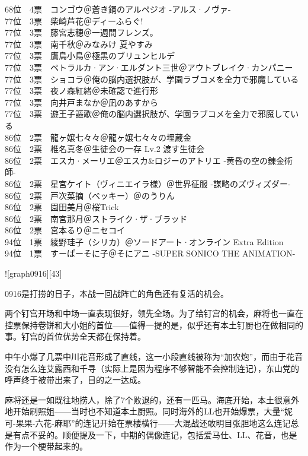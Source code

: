 {    68位　4票　コンゴウ＠蒼き鋼のアルペジオ -アルス·ノヴァ-\\
    77位　3票　柴崎芦花＠ディーふらぐ!\\
    77位　3票　藤宮志穂＠一週間フレンズ。\\
    77位　3票　南千秋＠みなみけ 夏やすみ\\
    77位　3票　鷹鳥小鳥＠極黒のブリュンヒルデ\\
    77位　3票　ペトラルカ·アン·エルダント三世＠アウトブレイク·カンパニー\\
    77位　3票　ショコラ＠俺の脳内選択肢が、学園ラブコメを全力で邪魔している\\
    77位　3票　夜ノ森紅緒＠未確認で進行形\\
    77位　3票　向井戸まなか＠凪のあすから\\
    77位　3票　遊王子謳歌＠俺の脳内選択肢が、学園ラブコメを全力で邪魔している\\
    86位　2票　龍ヶ嬢七々々＠龍ヶ嬢七々々の埋蔵金\\
    86位　2票　椎名真冬＠生徒会の一存 Lv.2 渡す生徒会\\
    86位　2票　エスカ·メーリエ＠エスカ\&ロジーのアトリエ -黄昏の空の錬金術師-\\
    86位　2票　星宮ケイト（ヴィニエイラ様）＠世界征服 -謀略のズヴィズダー-\\
    86位　2票　戸次菜摘（ベッキー）＠のうりん\\
    86位　2票　園田美月＠桜Trick\\
    86位　2票　南宮那月＠ストライク·ザ·ブラッド\\
    86位　2票　宮本るり＠ニセコイ\\
    94位　1票　綾野珪子（シリカ）＠ソードアート·オンライン Extra Edition\\
    94位　1票　すーぱーそに子＠そにアニ -SUPER SONICO THE ANIMATION-
}

![graph0916][43]

0916是打捞的日子，本战一回战阵亡的角色还有复活的机会。

两个钉宫开场和中场一直表现很好，领先全场。为了给钉宫的机会，麻将也一直在控票保持卷饼和大小姐的首位——值得一提的是，似乎还有本土钉厨也在做相同的事。钉宫的首位优势全天都在保持着。

中午小爆了几票中川花音形成了直线，这一小段直线被称为“加农炮”，而由于花音没有怎么连艾露西和千寻（实际上是因为程序不够智能不会控制连记），东山党的呼声终于被带出来了，目的之一达成。

麻将还是一如既往地捞人，除了7个败退的，还有一匹马。海底开始，本土很意外地开始刷照姐——当时也不知道本土厨照。同时海外的LL也开始爆票，大量“妮可-果果-六花-麻耶”的连记开始在票楼横行——大混战还敢明目张胆地这么连记总是有点不妥的。顺便提及一下，中期的偶像连记，包括爱马仕、LL、花音，也是作为一个梗带起来的。

